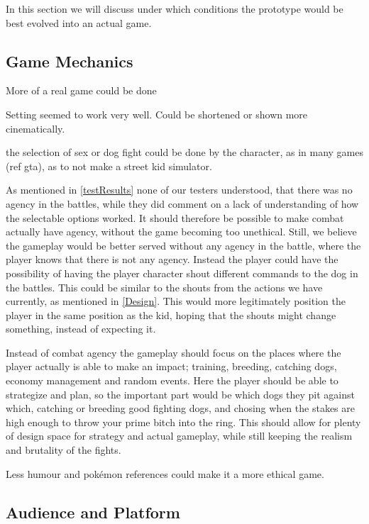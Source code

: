 In this section we will discuss under which conditions the prototype would be best evolved into an actual game.

\subsection{Game Mechanics}

More of a real game could be done\

Setting seemed to work very well.  Could be shortened or shown more cinematically.\

the selection of sex or dog fight could be done by the character, as in many games (ref gta), as to not make a street kid simulator.\

As mentioned in \ref{testResults} none of our testers understood, that there was no agency in the battles, while they did comment on a lack of understanding of how the selectable options worked. It should therefore be possible to make combat actually have agency, without the game becoming too unethical. Still, we believe the gameplay would be better served without any agency in the battle, where the player knows that there is not any agency. Instead the player could have the possibility of having the player character shout different commands to the dog in the battles. This could be similar to the shouts from the actions we have currently, as mentioned in \ref{Design}. This would more legitimately position the player in the same position as the kid, hoping that the shouts might change something, instead of expecting it.\

Instead of combat agency the gameplay should focus on the places where the player actually is able to make an impact; training, breeding, catching dogs, economy management and random events. Here the player should be able to strategize and plan, so the important part would be which dogs they pit against which, catching or breeding good fighting dogs, and chosing when the stakes are high enough to throw your prime bitch into the ring. This should allow for plenty of design space for strategy and actual gameplay, while still keeping the realism and brutality of the fights. \

Less humour and pokémon references could make it a more ethical game. \

\subsection{Audience and Platform}


